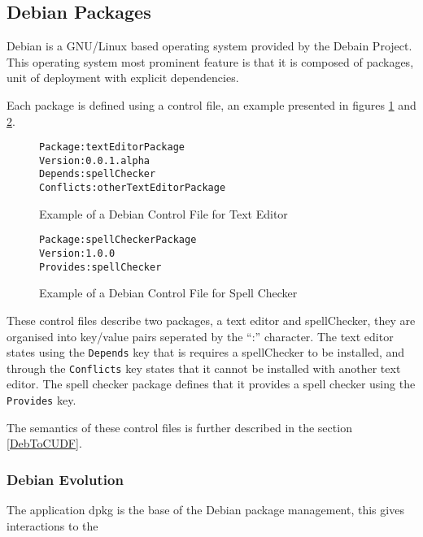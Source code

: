 \subsection{Debian Packages}
Debian is a GNU/Linux based operating system provided by the Debain Project.
This operating system most prominent feature is that it is composed of packages, unit of deployment with explicit dependencies.

Each package is defined using a control file, an example presented in figures \ref{debianmetadatate} and \ref{debianmetadatasc}.

\begin{figure}[htp]
\begin{center}
\begin{alltt}
Package: textEditorPackage
Version: 0.0.1.alpha
Depends: spellChecker
Conflicts: otherTextEditorPackage
\end{alltt}
  \caption[Debian Control file for Text Editor]{Example of a Debian Control File for Text Editor}
  \label{debianmetadatate}
\end{center}
\end{figure}

\begin{figure}[htp]
\begin{center}
\begin{alltt}
Package: spellCheckerPackage
Version: 1.0.0
Provides: spellChecker
\end{alltt}
  \caption[Debian Control files for Spell Checker]{Example of a Debian Control File for Spell Checker}
  \label{debianmetadatasc}
\end{center}
\end{figure}

These control files describe two packages, a text editor and spellChecker, they are organised into key/value pairs seperated by the ``:'' character.
The text editor states using the \verb+Depends+ key that is requires a spellChecker to be installed, 
and through the \verb+Conflicts+ key states that it cannot be installed with another text editor.
The spell checker package defines that it provides a spell checker  using the \verb+Provides+ key.

The semantics of these control files is further described in the section \ref{DebToCUDF}.

\subsubsection{Debian Evolution}
The application dpkg is the base of the Debian package management, this gives interactions to the


